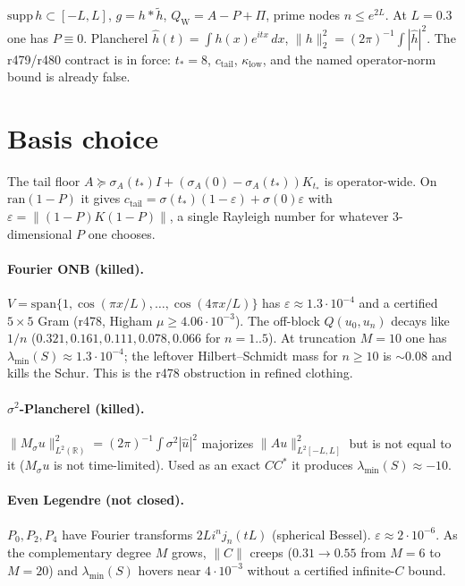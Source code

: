 \documentclass[11pt]{article}
\theoremstyle{remark}
\newcommand{\QW}{Q_{\mathrm W}}
\begin{document}
$\mathrm{supp}\,h\subset[-L,L]$, $g=h*\widetilde h$,
$\QW=A-P+\Pi$, prime nodes $n\le e^{2L}$.
At $L=0.3$ one has $P\equiv0$.
Plancherel $\hat h(t)=\int h(x)e^{itx}\,dx$,
$\|h\|_2^2=(2\pi)^{-1}\int|\hat h|^2$.
The r479/r480 contract is in force:
$t_*=8$, $c_{\mathrm{tail}}$, $\kappa_{\mathrm{low}}$,
and the named operator-norm bound is already false.

\section{Basis choice}

The tail floor
$A\succeq\sigma_A(t_*)I+(\sigma_A(0)-\sigma_A(t_*))K_{t_*}$
is operator-wide.
On $\mathrm{ran}(1-P)$ it gives
$c_{\mathrm{tail}}=\sigma(t_*)(1-\varepsilon)+\sigma(0)\varepsilon$
with $\varepsilon=\|(1-P)K(1-P)\|$, a single Rayleigh number
for whatever $3$-dimensional $P$ one chooses.

\paragraph{Fourier ONB (killed).}
$V=\mathrm{span}\{1,\cos(\pi x/L),\dots,\cos(4\pi x/L)\}$
has $\varepsilon\approx1.3\cdot10^{-4}$ and a certified
$5\times5$ Gram (r478, Higham $\mu\ge4.06\cdot10^{-3}$).
The off-block
$Q(u_0,u_n)$ decays like $1/n$
($0.321,0.161,0.111,0.078,0.066$ for $n=1..5$).
At truncation $M=10$ one has $\lambda_{\min}(S)\approx1.3\cdot10^{-4}$;
the leftover Hilbert--Schmidt mass for $n\ge10$ is $\sim0.08$
and kills the Schur.
This is the r478 obstruction in refined clothing.

\paragraph{$\sigma^2$-Plancherel (killed).}
$\|M_\sigma u\|_{L^2(\mathbb R)}^2=(2\pi)^{-1}\int\sigma^2|\hat u|^2$
majorizes $\|Au\|_{L^2[-L,L]}^2$ but is not equal to it
($M_\sigma u$ is not time-limited).
Used as an exact $CC^*$ it produces
$\lambda_{\min}(S)\approx-10$.

\paragraph{Even Legendre (not closed).}
$P_0,P_2,P_4$ have Fourier transforms
$2Li^n j_n(tL)$ (spherical Bessel).
$\varepsilon\approx2\cdot10^{-6}$.
As the complementary degree $M$ grows,
$\|C\|$ creeps ($0.31\to0.55$ from $M=6$ to $M=20$)
and $\lambda_{\min}(S)$ hovers near $4\cdot10^{-3}$
without a certified infinite-$C$ bound.
\end{document}
